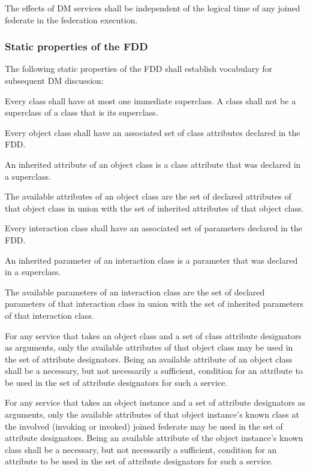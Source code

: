 \begin{compactstdpage}
    The effects of DM services shall be independent of the logical time of any joined federate in the federation execution.

    \subsubsection{Static properties of the FDD}

    The following static properties of the FDD shall establish vocabulary for subsequent DM discussion:

    \begin{stdalphalist}
        \item Every class shall have at most one immediate superclass. A class shall not be a superclass of a class that is its superclass.
        \item Every object class shall have an associated set of class attributes declared in the FDD.
        \item An inherited attribute of an object class is a class attribute that was declared in a superclass.
        \item The available attributes of an object class are the set of declared attributes of that object class in union with the set of inherited attributes of that object class.
        \item Every interaction class shall have an associated set of parameters declared in the FDD.
        \item An inherited parameter of an interaction class is a parameter that was declared in a superclass.
        \item The available parameters of an interaction class are the set of declared parameters of that interaction class in union with the set of inherited parameters of that interaction class.
        \item For any service that takes an object class and a set of class attribute designators as arguments, only the available attributes of that object class may be used in the set of attribute designators. Being an available attribute of an object class shall be a necessary, but not necessarily a sufficient, condition for an attribute to be used in the set of attribute designators for such a service.
        \item For any service that takes an object instance and a set of attribute designators as arguments, only the available attributes of that object instance's known class at the involved (invoking or invoked) joined federate may be used in the set of attribute designators. Being an available attribute of the object instance's known class shall be a necessary, but not necessarily a sufficient, condition for an attribute to be used in the set of attribute designators for such a service.
    \end{stdalphalist}
\end{compactstdpage}

